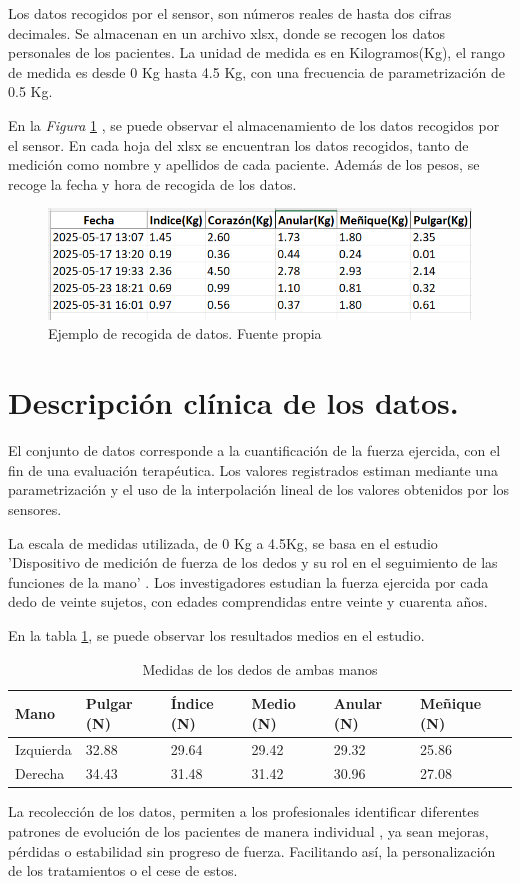 Los datos recogidos por el sensor, son números reales de hasta dos cifras decimales. Se almacenan en un archivo xlsx, donde se recogen los datos personales de los pacientes.
La unidad de medida es en Kilogramos(Kg), el rango de medida es desde 0 Kg hasta 4.5 Kg, con una frecuencia de parametrización de 0.5 Kg.

En la \textit{Figura} \ref{fig:Datosxlsx} , se puede observar el almacenamiento de los datos recogidos por el sensor. En cada hoja del xlsx se encuentran los datos recogidos, tanto de medición como nombre y apellidos de cada paciente. Además de los pesos, se recoge la fecha y hora de recogida de los datos. 
\begin{figure}
    \centering
    \includegraphics[width=0.8\linewidth]{img/Datos.png}
    \caption{Ejemplo de recogida de datos. Fuente propia}
    \label{fig:Datosxlsx}
\end{figure}
\section{Descripción clínica de los datos.}

El conjunto de datos corresponde a la cuantificación de la fuerza ejercida, con el fin de una evaluación terapéutica. Los valores registrados estiman mediante una parametrización y el uso de la interpolación lineal de los valores obtenidos por los sensores.

La escala de medidas utilizada, de 0 Kg a 4.5Kg, se basa en el estudio 'Dispositivo de medición de fuerza de los dedos y su rol en el seguimiento de las funciones de la mano'  \cite{GOMEZ2022}. Los investigadores estudian la fuerza ejercida por cada dedo de veinte sujetos, con edades comprendidas entre veinte y cuarenta años.

En la tabla \ref{tab:medidas_dedos}, se puede observar los resultados medios en el estudio. 

\begin{table}[h]
    \begin{tabular}{|l|l|l|l|l|l|}
\hline
\rowcolor[HTML]{BFBFBF} 
    Mano & Pulgar (N) & Índice (N) & Medio (N) & Anular (N)& Meñique (N) \\ \hline 
    Izquierda & 32.88 & 29.64 & 29.42 & 29.32 & 25.86 \\ \hline
    Derecha & 34.43 & 31.48 & 31.42 & 30.96 & 27.08 \\ \hline
    \end{tabular}
    \caption{Medidas de los dedos de ambas manos}
    \label{tab:medidas_dedos}
\end{table}

La recolección de los datos, permiten a los profesionales identificar diferentes patrones de evolución de los pacientes de manera individual , ya sean mejoras, pérdidas o estabilidad sin progreso de fuerza. Facilitando así, la personalización de los tratamientos o el cese de estos.